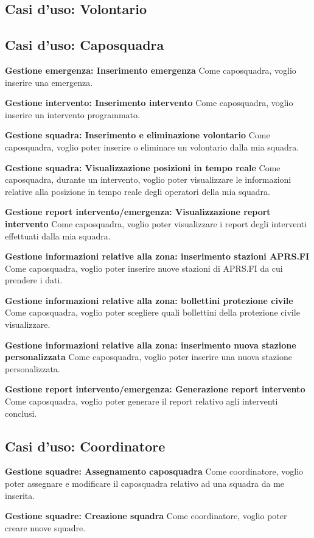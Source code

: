 \subsection{Casi d'uso: Volontario}


\subsection{Casi d'uso: Caposquadra}

\textbf{Gestione emergenza: Inserimento emergenza}
Come caposquadra, voglio inserire una emergenza.

\textbf{Gestione intervento: Inserimento intervento}
Come caposquadra, voglio inserire un intervento programmato.

\textbf{Gestione squadra: Inserimento e eliminazione volontario}
Come caposquadra, voglio poter inserire o eliminare un volontario dalla mia squadra.

\textbf{Gestione squadra: Visualizzazione posizioni in tempo reale}
Come caposquadra, durante un intervento, voglio poter visualizzare le informazioni relative alla posizione in tempo reale degli operatori della mia squadra.

\textbf{Gestione report intervento/emergenza: Visualizzazione report intervento}
Come caposquadra, voglio poter visualizzare i report degli interventi effettuati dalla mia squadra.

\textbf{Gestione informazioni relative alla zona: inserimento stazioni APRS.FI}
Come caposquadra, voglio poter inserire nuove stazioni di APRS.FI da cui prendere i dati.

\textbf{Gestione informazioni relative alla zona: bollettini protezione civile}
Come caposquadra, voglio poter scegliere quali bollettini della protezione civile visualizzare.

\textbf{Gestione informazioni relative alla zona: inserimento nuova stazione personalizzata}
Come caposquadra, voglio poter inserire una nuova stazione personalizzata.

\textbf{Gestione report intervento/emergenza: Generazione report intervento}
Come caposquadra, voglio poter generare il report relativo agli interventi conclusi.

\subsection{Casi d'uso: Coordinatore}

\textbf{Gestione squadre: Assegnamento caposquadra}
Come coordinatore, voglio poter assegnare e modificare il caposquadra relativo ad una squadra da me inserita.

\textbf{Gestione squadre: Creazione squadra}
Come coordinatore, voglio poter creare nuove squadre.
